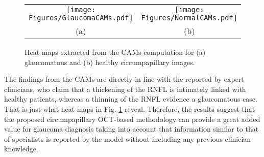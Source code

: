 \begin{figure}[h]
\begin{center}
\begin{tabular}{cc}
\texttt{[image: Figures/GlaucomaCAMs.pdf]} &
\texttt{[image: Figures/NormalCAMs.pdf]} \\
(a) &
(b) \\
\end{tabular}
\end{center}
\caption{Heat maps extracted from the CAMs computation for (a) glaucomatous and (b) healthy circumpapillary images.}
\label{Class_Activation}
\end{figure}

The findings from the CAMs are directly in line with the reported by expert clinicians, who claim that a thickening of the RNFL is intimately linked with healthy patients, whereas a thinning of the RNFL evidence a glaucomatous case. That is just what heat maps in Fig. \ref{Class_Activation} reveal. Therefore, the results suggest that the proposed circumpapillary OCT-based methodology can provide a great added value for glaucoma diagnosis taking into account that information similar to that of specialists is reported by the model without including any previous clinician knowledge. 


 


